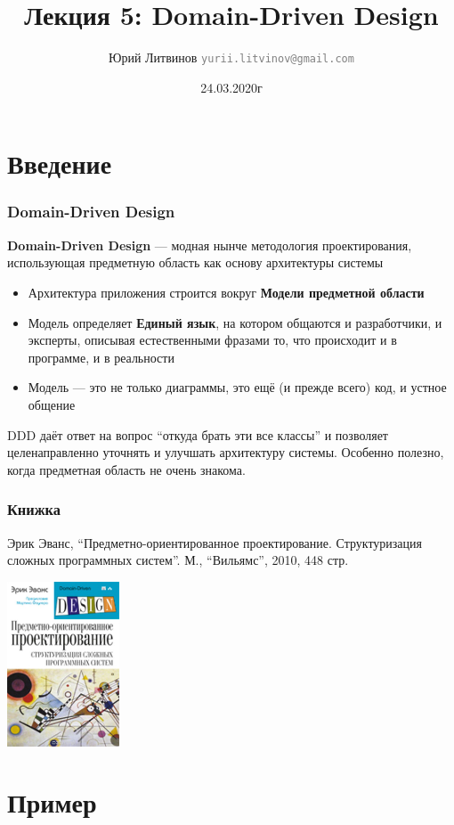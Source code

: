 \documentclass[xetex,mathserif,serif]{beamer}
\title{Лекция 5: Domain-Driven Design}
\author[Юрий Литвинов]{Юрий Литвинов \newline \textcolor{gray}{\small\texttt{yurii.litvinov@gmail.com}}}
\date{24.03.2020г}
\begin{document}
	
	\frame{\titlepage}

	\section{Введение}

	\begin{frame}
		\frametitle{Domain-Driven Design}
		\textbf{Domain-Driven Design} --- модная нынче методология проектирования, использующая предметную область как основу архитектуры системы
		\begin{itemize}
			\item Архитектура приложения строится вокруг \textbf{Модели предметной области}
			\item Модель определяет \textbf{Единый язык}, на котором общаются и разработчики, и эксперты, описывая естественными фразами то, что происходит и в программе, и в реальности
			\item Модель --- это не только диаграммы, это ещё (и прежде всего) код, и устное общение
		\end{itemize}
		DDD даёт ответ на вопрос ``откуда брать эти все классы'' и позволяет целенаправленно уточнять и улучшать архитектуру системы. 
		Особенно полезно, когда предметная область не очень знакома.
	\end{frame}

	\begin{frame}
		\frametitle{Книжка}
		Эрик Эванс, ``Предметно-ориентированное проектирование. Структуризация сложных программных систем''. М., ``Вильямс'', 2010, 448 стр.
		\begin{center}
			\includegraphics[width=0.25\textwidth]{dddCover.jpg}
		\end{center}
	\end{frame}

	\section{Пример}
\end{document}
